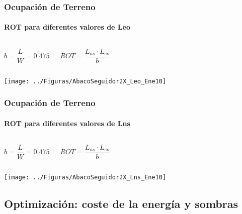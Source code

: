 \documentclass[xcolor=dvipsnames]{beamer}
\begin{document}
\begin{frame}[plain]
\frametitle{Ocupación de Terreno}


\framesubtitle{ROT para diferentes valores de Leo}
\begin{columns}[t]%


\column{4cm}

{\footnotesize \[
b=\frac{L}{W}=0.475\]
}{\footnotesize \par}


\column{4cm}

{\footnotesize \[
ROT=\frac{L_{ns}\cdot L_{eo}}{b}\]
}{\footnotesize \par}

\end{columns}%
\begin{center}
\texttt{[image: ../Figuras/AbacoSeguidor2X\_Leo\_Ene10]}
\par\end{center}


\end{frame}

\begin{frame}[plain]
\frametitle{Ocupación de Terreno}


\framesubtitle{ROT para diferentes valores de Lns}
\begin{columns}[t]%


\column{4cm}

{\footnotesize \[
b=\frac{L}{W}=0.475\]
}{\footnotesize \par}


\column{4cm}

{\footnotesize \[
ROT=\frac{L_{ns}\cdot L_{eo}}{b}\]
}{\footnotesize \par}

\end{columns}%
\begin{center}
\texttt{[image: ../Figuras/AbacoSeguidor2X\_Lns\_Ene10]}
\par\end{center}


\end{frame}


\subsection{Optimización: coste de la energía y sombras}
\label{sec:optimización}
\end{document}
